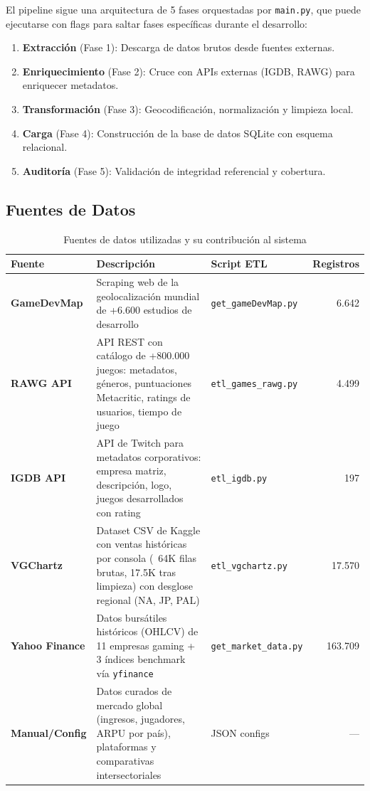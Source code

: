 \documentclass[11pt,a4paper]{article}
\begin{document}
El pipeline sigue una arquitectura de 5 fases orquestadas por \texttt{main.py}, que puede ejecutarse con flags para saltar fases específicas durante el desarrollo:

\begin{enumerate}
  \item \textbf{Extracción} (Fase 1): Descarga de datos brutos desde fuentes externas.
  \item \textbf{Enriquecimiento} (Fase 2): Cruce con APIs externas (IGDB, RAWG) para enriquecer metadatos.
  \item \textbf{Transformación} (Fase 3): Geocodificación, normalización y limpieza local.
  \item \textbf{Carga} (Fase 4): Construcción de la base de datos SQLite con esquema relacional.
  \item \textbf{Auditoría} (Fase 5): Validación de integridad referencial y cobertura.
\end{enumerate}

\subsection{Fuentes de Datos}

\begin{table}[H]
\centering
\caption{Fuentes de datos utilizadas y su contribución al sistema}
\label{tab:fuentes}
\begin{tabularx}{\textwidth}{>{\bfseries}l X l r}
\toprule
Fuente & Descripción & Script ETL & Registros \\
\midrule
GameDevMap & Scraping web de la geolocalización mundial de +6.600 estudios de desarrollo & \texttt{get\_gameDevMap.py} & 6.642 \\
\addlinespace
RAWG API & API REST con catálogo de +800.000 juegos: metadatos, géneros, puntuaciones Metacritic, ratings de usuarios, tiempo de juego & \texttt{etl\_games\_rawg.py} & 4.499 \\
\addlinespace
IGDB API & API de Twitch para metadatos corporativos: empresa matriz, descripción, logo, juegos desarrollados con rating & \texttt{etl\_igdb.py} & 197 \\
\addlinespace
VGChartz & Dataset CSV de Kaggle con ventas históricas por consola (~64K filas brutas, 17.5K tras limpieza) con desglose regional (NA, JP, PAL) & \texttt{etl\_vgchartz.py} & 17.570 \\
\addlinespace
Yahoo Finance & Datos bursátiles históricos (OHLCV) de 11 empresas gaming + 3 índices benchmark vía \texttt{yfinance} & \texttt{get\_market\_data.py} & 163.709 \\
\addlinespace
Manual/Config & Datos curados de mercado global (ingresos, jugadores, ARPU por país), plataformas y comparativas intersectoriales & JSON configs & ---  \\
\bottomrule
\end{tabularx}
\end{table}
\end{document}
